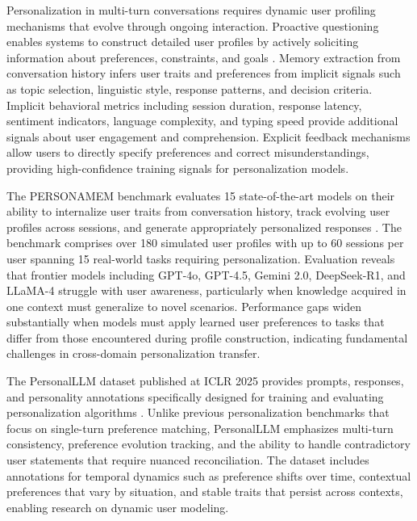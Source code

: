 \documentclass[11pt,letterpaper]{article}
\begin{document}
Personalization in multi-turn conversations requires dynamic user profiling mechanisms that evolve through ongoing interaction. Proactive questioning enables systems to construct detailed user profiles by actively soliciting information about preferences, constraints, and goals \cite{zhang2024knowme}. Memory extraction from conversation history infers user traits and preferences from implicit signals such as topic selection, linguistic style, response patterns, and decision criteria. Implicit behavioral metrics including session duration, response latency, sentiment indicators, language complexity, and typing speed provide additional signals about user engagement and comprehension. Explicit feedback mechanisms allow users to directly specify preferences and correct misunderstandings, providing high-confidence training signals for personalization models.

The PERSONAMEM benchmark evaluates 15 state-of-the-art models on their ability to internalize user traits from conversation history, track evolving user profiles across sessions, and generate appropriately personalized responses \cite{zhang2024knowme}. The benchmark comprises over 180 simulated user profiles with up to 60 sessions per user spanning 15 real-world tasks requiring personalization. Evaluation reveals that frontier models including GPT-4o, GPT-4.5, Gemini 2.0, DeepSeek-R1, and LLaMA-4 struggle with user awareness, particularly when knowledge acquired in one context must generalize to novel scenarios. Performance gaps widen substantially when models must apply learned user preferences to tasks that differ from those encountered during profile construction, indicating fundamental challenges in cross-domain personalization transfer.

The PersonalLLM dataset published at ICLR 2025 provides prompts, responses, and personality annotations specifically designed for training and evaluating personalization algorithms \cite{wang2025personalllm}. Unlike previous personalization benchmarks that focus on single-turn preference matching, PersonalLLM emphasizes multi-turn consistency, preference evolution tracking, and the ability to handle contradictory user statements that require nuanced reconciliation. The dataset includes annotations for temporal dynamics such as preference shifts over time, contextual preferences that vary by situation, and stable traits that persist across contexts, enabling research on dynamic user modeling.
\end{document}
